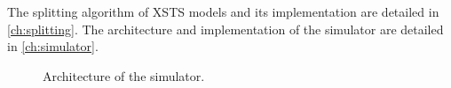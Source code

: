 The splitting algorithm of XSTS models and its implementation are detailed in \autoref{ch:splitting}. The architecture and implementation of the simulator are detailed in \autoref{ch:simulator}.

\begin{figure}[htbp]
	\centering
	
	\caption{Architecture of the simulator.}
	\label{fig:architecture}
\end{figure}


